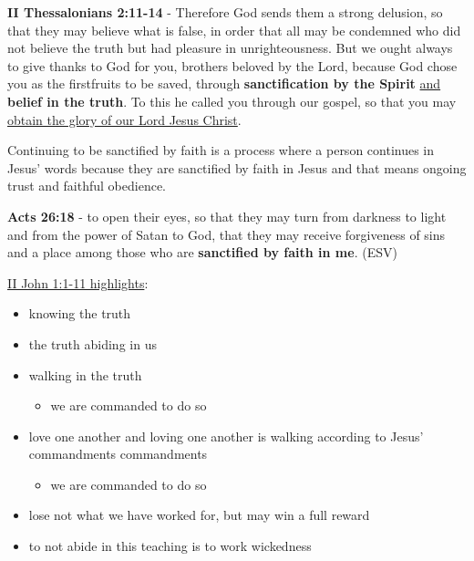 \documentclass[11pt]{article}
\begin{document}
\textbf{II Thessalonians 2:11-14} - Therefore God sends them a strong delusion, so that they may believe what is false, in order that all may be condemned who did not believe the truth but had pleasure in unrighteousness. But we ought always to give thanks to God for you, brothers beloved by the Lord, because God chose you as the firstfruits to be saved, through \textbf{sanctification by the Spirit} \uline{and} \textbf{belief in the truth}. To this he called you through our gospel, so that you may \uline{obtain the glory of our Lord Jesus Christ}.

Continuing to be sanctified by faith is a process where a person continues in Jesus' words because they are sanctified by faith in Jesus and that means ongoing trust and faithful obedience.

\textbf{Acts 26:18} - to open their eyes, so that they may turn from darkness to light and from the power of Satan to God, that they may receive forgiveness of sins and a place among those who are \textbf{sanctified by faith in me}. (ESV)

\uline{II John 1:1-11 highlights}:
\begin{itemize}
\item knowing the truth
\item the truth abiding in us
\item walking in the truth
\begin{itemize}
\item we are commanded to do so
\end{itemize}
\item love one another and loving one another is walking according to Jesus' commandments commandments
\begin{itemize}
\item we are commanded to do so
\end{itemize}
\item lose not what we have worked for, but may win a full reward
\item to not abide in this teaching is to work wickedness
\end{itemize}
\end{document}
